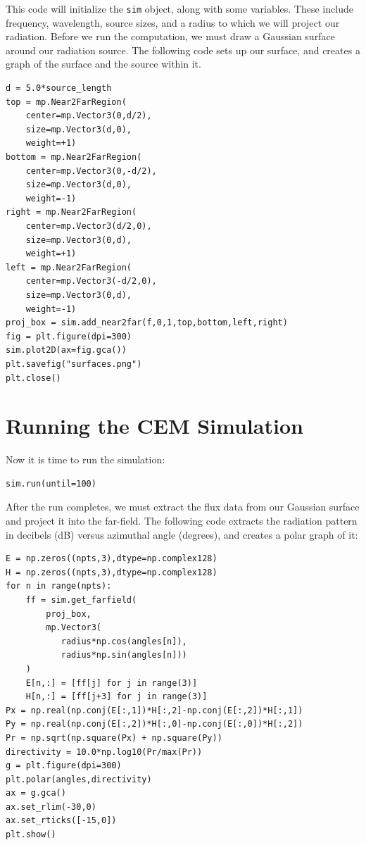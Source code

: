 \documentclass[10pt]{article}
\begin{document}
\noindent
This code will initialize the \verb+sim+ object, along with some variables.  These include frequency, wavelength, source sizes, and a radius to which we will project our radiation.  Before we run the computation, we must draw a Gaussian surface around our radiation source.  The following code sets up our surface, and creates a graph of the surface and the source within it.

\begin{verbatim}
d = 5.0*source_length
top = mp.Near2FarRegion(
    center=mp.Vector3(0,d/2),
    size=mp.Vector3(d,0),
    weight=+1)
bottom = mp.Near2FarRegion(
    center=mp.Vector3(0,-d/2),
    size=mp.Vector3(d,0),
    weight=-1)
right = mp.Near2FarRegion(
    center=mp.Vector3(d/2,0),
    size=mp.Vector3(0,d),
    weight=+1)
left = mp.Near2FarRegion(
    center=mp.Vector3(-d/2,0),
    size=mp.Vector3(0,d),
    weight=-1)
proj_box = sim.add_near2far(f,0,1,top,bottom,left,right)
fig = plt.figure(dpi=300)
sim.plot2D(ax=fig.gca())
plt.savefig("surfaces.png")
plt.close()
\end{verbatim}

\section{Running the CEM Simulation}

\noindent
Now it is time to run the simulation:

\begin{verbatim}
sim.run(until=100)
\end{verbatim}

\noindent
After the run completes, we must extract the flux data from our Gaussian surface and project it into the far-field.  The following code extracts the radiation pattern in decibels (dB) versus azimuthal angle (degrees), and creates a polar graph of it:

\begin{verbatim}
E = np.zeros((npts,3),dtype=np.complex128)
H = np.zeros((npts,3),dtype=np.complex128)
for n in range(npts):
    ff = sim.get_farfield(
        proj_box,
        mp.Vector3(
           radius*np.cos(angles[n]),
           radius*np.sin(angles[n]))
    )
    E[n,:] = [ff[j] for j in range(3)]
    H[n,:] = [ff[j+3] for j in range(3)]
Px = np.real(np.conj(E[:,1])*H[:,2]-np.conj(E[:,2])*H[:,1])
Py = np.real(np.conj(E[:,2])*H[:,0]-np.conj(E[:,0])*H[:,2])
Pr = np.sqrt(np.square(Px) + np.square(Py))
directivity = 10.0*np.log10(Pr/max(Pr))
g = plt.figure(dpi=300)
plt.polar(angles,directivity)
ax = g.gca()
ax.set_rlim(-30,0)
ax.set_rticks([-15,0])
plt.show()
\end{verbatim}
\end{document}
